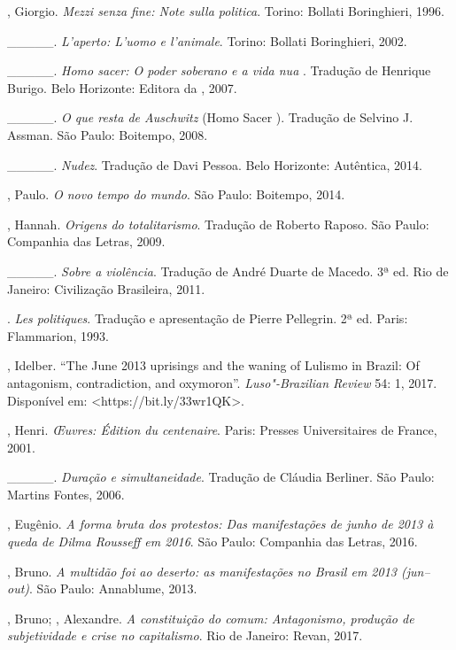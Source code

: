 \begin{Parskip}
, Giorgio. \emph{Mezzi senza fine: Note sulla politica}.
Torino: Bollati Boringhieri, 1996.

\_\_\_\_\_. \emph{L'aperto: L'uomo e l'animale}. Torino: Bollati
Boringhieri, 2002.

\_\_\_\_\_. \emph{Homo sacer: O poder soberano e a vida nua }.
Tradução de Henrique Burigo. Belo Horizonte: Editora da , 2007.

\_\_\_\_\_. \emph{O que resta de Auschwitz} (Homo Sacer ).
Tradução de Selvino J. Assman. São Paulo: Boitempo, 2008.

\_\_\_\_\_. \emph{Nudez}. Tradução de Davi Pessoa. Belo
Horizonte: Autêntica, 2014.

, Paulo. \emph{O novo tempo do mundo}. São Paulo: Boitempo, 2014.

, Hannah. \emph{Origens do totalitarismo}. Tradução de
Roberto Raposo. São Paulo: Companhia das Letras, 2009.

\_\_\_\_\_. \emph{Sobre a violência}. Tradução de André
Duarte de Macedo. 3ª ed. Rio de Janeiro: Civilização Brasileira, 2011.

. \emph{Les politiques}. Tradução e apresentação de Pierre Pellegrin. 2ª ed. Paris:  Flammarion, 1993.

, Idelber. ``The June 2013 uprisings and the waning of
Lulismo in Brazil: Of antagonism, contradiction, and oxymoron''.
\emph{Luso"-Brazilian Review} 54: 1, 2017. Disponível em:
\textless{}https://bit.ly/33wr1QK\textgreater{}.

, Henri. \emph{Œuvres: Édition du centenaire}. Paris:
Presses Universitaires de France, 2001.

\_\_\_\_\_. \emph{Duração e simultaneidade}. Tradução de Cláudia
Berliner. São Paulo: Martins Fontes, 2006.

, Eugênio. \emph{A forma bruta dos protestos: Das
manifestações de junho de 2013 à queda de Dilma Rousseff em 2016}. São
Paulo: Companhia das Letras, 2016.

, Bruno. \emph{A multidão foi ao deserto: as manifestações
no Brasil em 2013 (jun--out)}. São Paulo: Annablume, 2013.

, Bruno; , Alexandre. \emph{A constituição do comum:
Antagonismo, produção de subjetividade e crise no capitalismo}. Rio de
Janeiro: Revan, 2017.


\end{Parskip}
